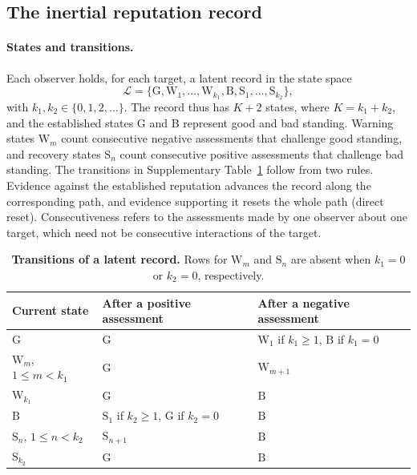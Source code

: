 \documentclass[10pt]{wlscirep}
\newcommand{\Lspace}{\mathscr{L}}          %
\newcommand{\st}[1]{\mathrm{#1}}           %
\theoremstyle{plain}
\theoremstyle{remark}
\begin{document}
\subsection{The inertial reputation record}
\label{si:record}

\paragraph{States and transitions.} Each observer holds, for each target, a latent record in the state space
\begin{equation}
\Lspace=\{\st G,\st W_1,\ldots,\st W_{k_1},\st B,\st S_1,\ldots,\st S_{k_2}\},
\label{eq:s-states}
\end{equation}
with $k_1,k_2\in\{0,1,2,\ldots\}$. The record thus has $K+2$ states, where $K=k_1+k_2$, and the established states G and B represent good and bad standing. Warning states $\st W_m$ count consecutive negative assessments that challenge good standing, and recovery states $\st S_n$ count consecutive positive assessments that challenge bad standing. The transitions in Supplementary Table~\ref{tab:si-transitions} follow from two rules. Evidence against the established reputation advances the record along the corresponding path, and evidence supporting it resets the whole path (direct reset). Consecutiveness refers to the assessments made by one observer about one target, which need not be consecutive interactions of the target.

\begin{table}[!htbp]
\centering
\caption{\textbf{Transitions of a latent record.} Rows for $\st W_m$ and $\st S_n$ are absent when $k_1=0$ or $k_2=0$, respectively.}
\label{tab:si-transitions}
\small
\begin{tabular}{@{}lll@{}}
\toprule
Current state & After a positive assessment & After a negative assessment\\
\midrule
$\st G$ & $\st G$ & $\st W_1$ if $k_1\geq1$, $\st B$ if $k_1=0$\\
$\st W_m$, $1\leq m<k_1$ & $\st G$ & $\st W_{m+1}$\\
$\st W_{k_1}$ & $\st G$ & $\st B$\\
$\st B$ & $\st S_1$ if $k_2\geq1$, $\st G$ if $k_2=0$ & $\st B$\\
$\st S_n$, $1\leq n<k_2$ & $\st S_{n+1}$ & $\st B$\\
$\st S_{k_2}$ & $\st G$ & $\st B$\\
\bottomrule
\end{tabular}
\end{table}
\end{document}
